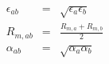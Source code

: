 \pagestyle{empty}


\begin{eqnarray*}
   \epsilon_{ab} &=& \sqrt{\epsilon_{a}\epsilon_{b}} \\
   R_{m,ab} &=& \frac{R_{m,a}+R_{m,b}}{2} \\ 
   \alpha_{ab} &=& \sqrt{\alpha_{a}\alpha_{b}} \\
\end{eqnarray*}                           


